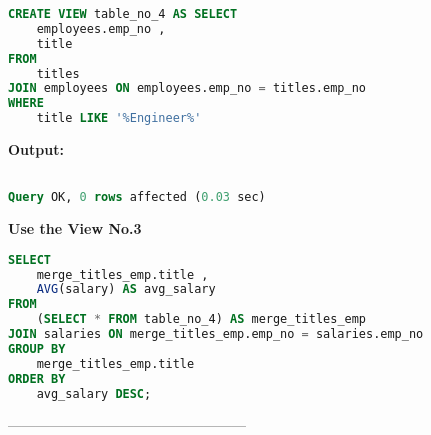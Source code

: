 \documentclass[12pt]{report}
\begin{document}
\begin{lstlisting}[language=sql]
CREATE VIEW table_no_4 AS SELECT
	employees.emp_no ,
	title
FROM
	titles
JOIN employees ON employees.emp_no = titles.emp_no
WHERE
	title LIKE '%Engineer%'
\end{lstlisting}


\textbf{Output:}

\begin{lstlisting}[language=sql]

Query OK, 0 rows affected (0.03 sec)

\end{lstlisting}

\textbf{Use the View No.3}
\begin{lstlisting}[language=sql]
SELECT
	merge_titles_emp.title ,
	AVG(salary) AS avg_salary
FROM
	(SELECT * FROM table_no_4) AS merge_titles_emp
JOIN salaries ON merge_titles_emp.emp_no = salaries.emp_no
GROUP BY
	merge_titles_emp.title
ORDER BY
	avg_salary DESC;
\end{lstlisting}

---------------------------------------------------
\end{document}
